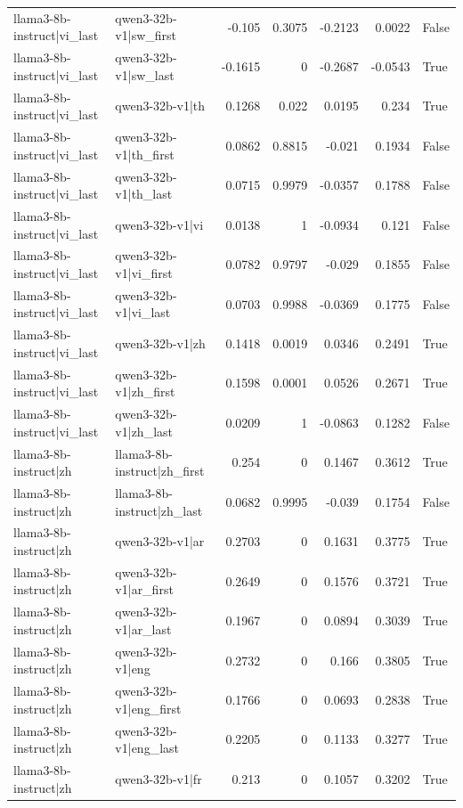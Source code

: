 \begin{table}
\begin{tabular}{l l r r r r l}
llama3-8b-instruct|vi_last & qwen3-32b-v1|sw_first & -0.105 & 0.3075 & -0.2123 & 0.0022 & False \\
llama3-8b-instruct|vi_last & qwen3-32b-v1|sw_last & -0.1615 & 0 & -0.2687 & -0.0543 & True \\
llama3-8b-instruct|vi_last & qwen3-32b-v1|th & 0.1268 & 0.022 & 0.0195 & 0.234 & True \\
llama3-8b-instruct|vi_last & qwen3-32b-v1|th_first & 0.0862 & 0.8815 & -0.021 & 0.1934 & False \\
llama3-8b-instruct|vi_last & qwen3-32b-v1|th_last & 0.0715 & 0.9979 & -0.0357 & 0.1788 & False \\
llama3-8b-instruct|vi_last & qwen3-32b-v1|vi & 0.0138 & 1 & -0.0934 & 0.121 & False \\
llama3-8b-instruct|vi_last & qwen3-32b-v1|vi_first & 0.0782 & 0.9797 & -0.029 & 0.1855 & False \\
llama3-8b-instruct|vi_last & qwen3-32b-v1|vi_last & 0.0703 & 0.9988 & -0.0369 & 0.1775 & False \\
llama3-8b-instruct|vi_last & qwen3-32b-v1|zh & 0.1418 & 0.0019 & 0.0346 & 0.2491 & True \\
llama3-8b-instruct|vi_last & qwen3-32b-v1|zh_first & 0.1598 & 0.0001 & 0.0526 & 0.2671 & True \\
llama3-8b-instruct|vi_last & qwen3-32b-v1|zh_last & 0.0209 & 1 & -0.0863 & 0.1282 & False \\
llama3-8b-instruct|zh & llama3-8b-instruct|zh_first & 0.254 & 0 & 0.1467 & 0.3612 & True \\
llama3-8b-instruct|zh & llama3-8b-instruct|zh_last & 0.0682 & 0.9995 & -0.039 & 0.1754 & False \\
llama3-8b-instruct|zh & qwen3-32b-v1|ar & 0.2703 & 0 & 0.1631 & 0.3775 & True \\
llama3-8b-instruct|zh & qwen3-32b-v1|ar_first & 0.2649 & 0 & 0.1576 & 0.3721 & True \\
llama3-8b-instruct|zh & qwen3-32b-v1|ar_last & 0.1967 & 0 & 0.0894 & 0.3039 & True \\
llama3-8b-instruct|zh & qwen3-32b-v1|eng & 0.2732 & 0 & 0.166 & 0.3805 & True \\
llama3-8b-instruct|zh & qwen3-32b-v1|eng_first & 0.1766 & 0 & 0.0693 & 0.2838 & True \\
llama3-8b-instruct|zh & qwen3-32b-v1|eng_last & 0.2205 & 0 & 0.1133 & 0.3277 & True \\
llama3-8b-instruct|zh & qwen3-32b-v1|fr & 0.213 & 0 & 0.1057 & 0.3202 & True \\

\end{tabular}
\end{table}
